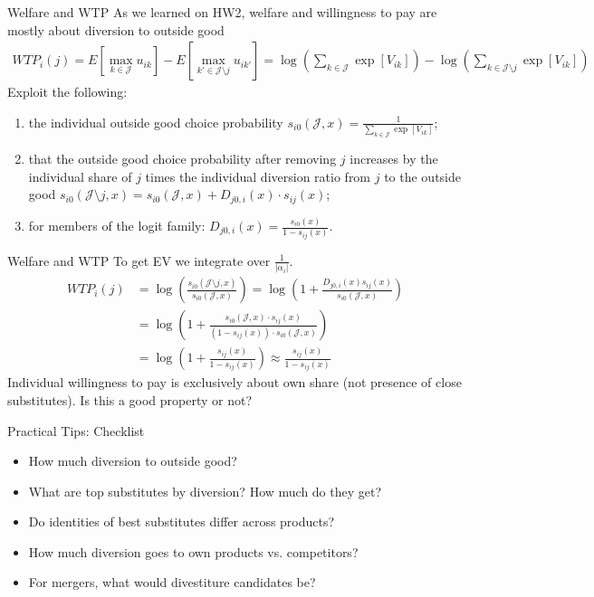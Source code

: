 \documentclass[xcolor=pdftex,dvipsnames,table,mathserif,aspectratio=169]{beamer}
\begin{document}
\begin{frame}{Welfare and WTP}
As we learned on HW2, welfare and willingness to pay are mostly about \alert{diversion to outside good}
\begin{align*}
WTP_i(j) = E[\max_{k \in \mathcal{J}} u_{ik}]  - E[\max_{k' \in \mathcal{J}\setminus j} u_{ik'} ] =  \log \left( \sum_{k \in \mathcal{J}} \exp[V_{ik}] \right)-  \log \left(\sum_{k \in \mathcal{J} \setminus j} \exp[V_{ik}]\right)
\end{align*}
Exploit the following:
\begin{enumerate}
 \item the individual outside good choice probability $s_{i0}(\mathcal{J},x) = \frac{1}{ \sum_{k \in \mathcal{J}} \exp[V_{ik}]}$;
 \item  that the outside good choice probability after removing $j$ increases by the individual share of $j$ times the individual diversion ratio from $j$ to the outside good $s_{i0}(\mathcal{J}\setminus j,x)  = s_{i0}(\mathcal{J},x) + D_{j0,i}(x) \cdot s_{ij}(x)$; 
 \item for members of the logit family: $D_{j0,i}(x) = \frac{s_{i0}(x)}{1-s_{ij}(x)}$. 
\end{enumerate}
\end{frame}

\begin{frame}{Welfare and WTP}
To get EV we integrate over $\frac{1}{|\alpha_i|}$.
\begin{align*}
WTP_i(j) &=\log \left( \frac{s_{i0}(\mathcal{J}\setminus j,x) }{s_{i0}(\mathcal{J},x) }\right)
=\log \left( 1+\frac{D_{j0,i}(x) s_{ij}(x)}{s_{i0}(\mathcal{J},x) }\right)\\
&=\log \left( 1+\frac{s_{i0}(\mathcal{J},x) \cdot s_{ij}(x)}{(1-s_{ij}(x)) \cdot s_{i0}(\mathcal{J},x) }\right)\\
&=\log \left( 1+\frac{s_{ij}(x)}{1-s_{ij}(x)  }\right)
\approx \frac{s_{ij}(x)}{1-s_{ij}(x) }
\end{align*}
Individual willingness to pay is exclusively about \alert{own share} (not presence of close substitutes). Is this a good property or not?
\end{frame}


\begin{frame}{Practical Tips: Checklist}
\begin{itemize}
\item How much diversion to outside good?
\item What are top substitutes by diversion? How much do they get?
\item Do identities of best substitutes differ across products?
\item How much diversion goes to own products vs. competitors?
\item For mergers, what would \alert{divestiture} candidates be?
\end{itemize}
\end{frame}
\end{document}
